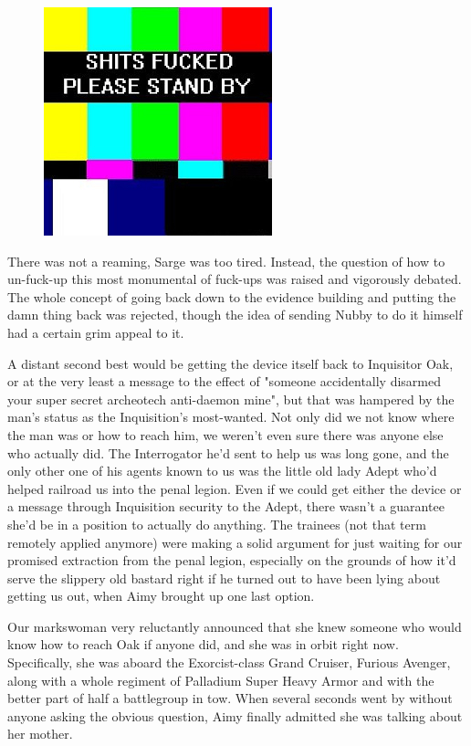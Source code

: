 \begin{figure}
	\begin{center}
		\includegraphics[width=\figwidth]{pics/21/120.png}
	\end{center}
\end{figure}
There was not a reaming, Sarge was too tired. 
Instead, the question of how to un-fuck-up this most monumental of fuck-ups was raised and vigorously debated. 
The whole concept of going back down to the evidence building and putting the damn thing back was rejected, though the idea of sending Nubby to do it himself had a certain grim appeal to it. 


A distant second best would be getting the device itself back to Inquisitor Oak, or at the very least a message to the effect of "someone accidentally disarmed your super secret archeotech anti-daemon mine", but that was hampered by the man's status as the Inquisition's most-wanted. 
Not only did we not know where the man was or how to reach him, we weren't even sure there was anyone else who actually did. 
The Interrogator he'd sent to help us was long gone, and the only other one of his agents known to us was the little old lady Adept who'd helped railroad us into the penal legion. 
Even if we could get either the device or a message through Inquisition security to the Adept, there wasn't a guarantee she'd be in a position to actually do anything. 
The trainees (not that term remotely applied anymore) were making a solid argument for just waiting for our promised extraction from the penal legion, especially on the grounds of how it'd serve the slippery old bastard right if he turned out to have been lying about getting us out, when Aimy brought up one last option.

Our markswoman very reluctantly announced that she knew someone who would know how to reach Oak if anyone did, and she was in orbit right now. 
Specifically, she was aboard the Exorcist-class Grand Cruiser, Furious Avenger, along with a whole regiment of Palladium Super Heavy Armor and with the better part of half a battlegroup in tow. 
When several seconds went by without anyone asking the obvious question, Aimy finally admitted she was talking about her mother.

